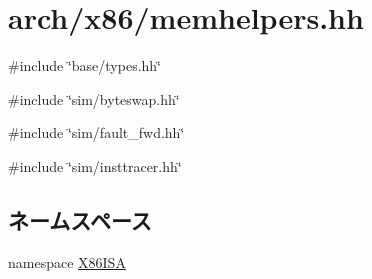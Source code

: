 \hypertarget{x86_2memhelpers_8hh}{
\section{arch/x86/memhelpers.hh}
\label{x86_2memhelpers_8hh}
}
{\ttfamily \#include \char`\"{}base/types.hh\char`\"{}}\par
{\ttfamily \#include \char`\"{}sim/byteswap.hh\char`\"{}}\par
{\ttfamily \#include \char`\"{}sim/fault\_\-fwd.hh\char`\"{}}\par
{\ttfamily \#include \char`\"{}sim/insttracer.hh\char`\"{}}\par
\subsection*{ネームスペース}
\begin{DoxyCompactItemize}
\item 
namespace \hyperlink{namespaceX86ISA}{X86ISA}
\end{DoxyCompactItemize}
